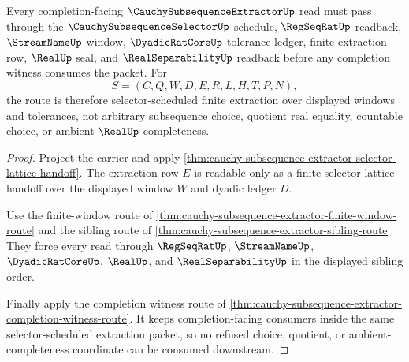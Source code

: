 \begin{theorem}
\label{thm:cauchy-subsequence-extractor-selector-route}
Every completion-facing $\CauchySubsequenceExtractorUp$ read must pass through the $\CauchySubsequenceSelectorUp$ schedule, $\RegSeqRatUp$ readback, $\StreamNameUp$ window, $\DyadicRatCoreUp$ tolerance ledger, finite extraction row, $\RealUp$ seal, and $\RealSeparabilityUp$ readback before any completion witness consumes the packet. For
$$
S=(C,Q,W,D,E,R,L,H,T,P,N),
$$
the route is therefore selector-scheduled finite extraction over displayed windows and tolerances, not arbitrary subsequence choice, quotient real equality, countable choice, or ambient $\RealUp$ completeness.
\end{theorem}
\begin{proof}
Project the carrier and apply \autoref{thm:cauchy-subsequence-extractor-selector-lattice-handoff}. The extraction row $E$ is readable only as a finite selector-lattice handoff over the displayed window $W$ and dyadic ledger $D$.

Use the finite-window route of \autoref{thm:cauchy-subsequence-extractor-finite-window-route} and the sibling route of \autoref{thm:cauchy-subsequence-extractor-sibling-route}. They force every read through $\RegSeqRatUp$, $\StreamNameUp$, $\DyadicRatCoreUp$, $\RealUp$, and $\RealSeparabilityUp$ in the displayed sibling order.

Finally apply the completion witness route of \autoref{thm:cauchy-subsequence-extractor-completion-witness-route}. It keeps completion-facing consumers inside the same selector-scheduled extraction packet, so no refused choice, quotient, or ambient-completeness coordinate can be consumed downstream.
\end{proof}

